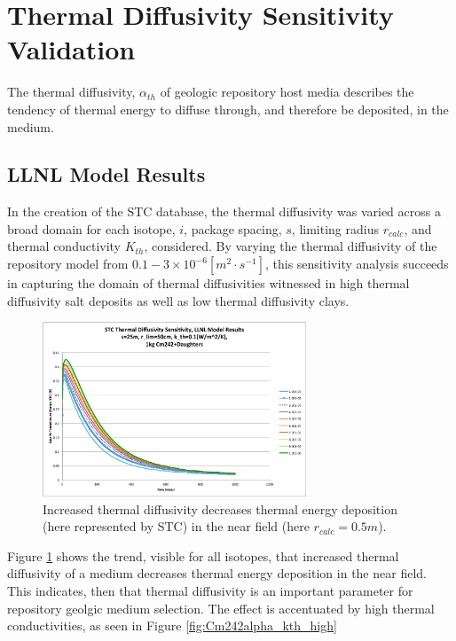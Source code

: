 \section{Thermal Diffusivity Sensitivity Validation}\label{sec:diffusivity}
The thermal diffusivity, $\alpha_{th}$ of geologic repository host media 
describes the tendency of thermal energy to diffuse through, and therefore be 
deposited, in the medium.

\FloatBarrier
\subsection{LLNL Model Results}

In the creation of the \gls{STC} database, the thermal diffusivity was varied 
across a broad domain for each isotope, $i$, package spacing, $s$, limiting 
radius $r_{calc}$, and thermal conductivity $K_{th}$, considered.  By 
varying the thermal diffusivity of the repository model from $0.1-3\times 
10^{-6} [m^2\cdot s^{-1}]$, this sensitivity analysis succeeds in capturing the domain of 
thermal diffusivities witnessed in high thermal diffusivity salt deposits as 
well as low thermal diffusivity clays.

\begin{figure}[htbp!]
\begin{center}
\includegraphics[width=0.7\textwidth]{./chapters/demonstration/diffusivity/Cm242alpha_kth_low.eps}
\end{center}
\caption[$K_{th}$ Sensitivity to $\alpha_{th}$ for $k_{th}$]{Increased thermal diffusivity decreases thermal energy deposition 
(here represented by \gls{STC}) in the near field (here $r_{calc} = 0.5m$).}
\label{fig:Cm242alpha_kth_low}
\end{figure}


Figure \ref{fig:Cm242alpha_kth_low} shows the trend, visible for all isotopes, 
that increased thermal diffusivity of a medium decreases thermal energy 
deposition in the near field. This indicates, then that thermal diffusivity is 
an important parameter for repository geolgic medium selection. The effect is 
accentuated by high thermal conductivities, as seen in 
Figure \ref{fig:Cm242alpha_kth_high}

